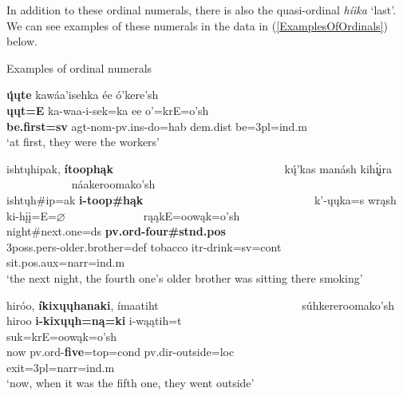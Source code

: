 In addition to these ordinal numerals, there is also the  quasi-ordinal \textit{híika} `last'. We can see examples of these numerals in the data in (\ref{ExamplesOfOrdinals}) below.

\begin{exe}

\item\label{ExamplesOfOrdinals} Examples of ordinal numerals

\begin{xlist}

\item\label{ExamplesOfOrdinals1} \glll \textbf{ų́ųte} kawáa'isehka ée ó'kere'sh\\
    \textbf{ųųt=E} ka-waa-i-sek=ka ee o'=krE=o'sh\\
    \textbf{\textnormal{\bfseries be.first}=sv} agt-nom-pv.ins-\textnormal{do}=hab dem.dist \textnormal{be}=3pl=ind.m\\
    \glt `at first, they were the workers' \citep[51]{hollow1973a}
    
\item\label{ExamplesOfOrdinals2} \glll ishtųhipak, \textbf{ítoophąk} ~ ~ ~ ~ ~ ~ ~ ~ ~ ~ ~ ~ ~ ~ ~ ~ ~ ~  kų́'kas manásh kih\'{ı̨}įra ~ ~ ~ ~ ~ ~ ~ ~ náakeroomako'sh\\
    ishtųh\#ip=ak \textbf{i-toop\#hąk} ~ ~ ~ ~ ~ ~ ~ ~ ~ ~ ~ ~ ~ ~ ~ ~ ~ ~ k'-ųųka=s wrąsh ki-hįį=E=$\varnothing$ ~ ~ ~ ~ ~ ~ ~ ~ rąąkE=oowąk=o'sh\\
    \textnormal{night}\#\textnormal{next.one}=ds \textbf{pv.ord-\textnormal{\bfseries four}\#stnd.pos} ~ ~ ~ ~ ~ ~ ~ ~ ~ ~ ~ ~ ~ ~ ~ ~ ~ ~ 3poss.pers-\textnormal{older.brother}=def \textnormal{tobacco} itr-\textnormal{drink}=sv=cont ~ ~ ~ ~ ~ ~ ~ ~ \textnormal{sit}.pos.aux=narr=ind.m\\
    \glt `the next night, the fourth one's older brother was sitting there smoking' \citep[245]{hollow1973b}

\item\label{ExamplesOfOrdinals3} \glll hiróo, \textbf{íkixųųhanaki}, ímaatiht ~ ~ ~ ~ ~ ~ ~ ~ ~ ~ ~ ~ ~ ~ ~  súhkereroomako'sh\\
    hiroo \textbf{i-kixųųh=ną=ki} i-wąątih=t ~ ~ ~ ~ ~ ~ ~ ~ ~ ~ ~ ~ ~ ~ ~  suk=krE=oowąk=o'sh\\
    \textnormal{now} pv.ord-\textnormal{\bfseries five}=top=cond pv.dir-\textnormal{outside}=loc ~ ~ ~ ~ ~ ~ ~ ~ ~ ~ ~ ~ ~ ~ ~ \textnormal{exit}=3pl=narr=ind.m\\
    \glt `now, when it was the fifth one, they went outside' \citep[201]{hollow1973a}

\end{xlist}

\end{exe}

